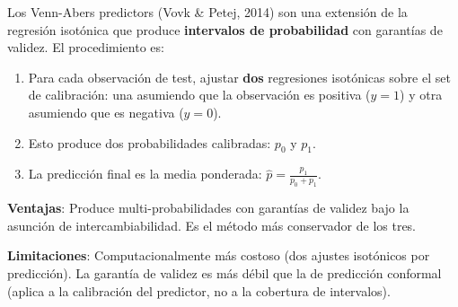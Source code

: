 \documentclass[
  spanish,
  11pt,
  letterpaper,
]{scrbook}
\providecommand{\tightlist}{%
  \setlength{\itemsep}{0pt}\setlength{\parskip}{0pt}}
\theoremstyle{plain}
\theoremstyle{remark}
\begin{document}
Los Venn-Abers predictors (Vovk \& Petej, 2014) son una extensión de la
regresión isotónica que produce \textbf{intervalos de probabilidad} con
garantías de validez. El procedimiento es:

\begin{enumerate}
\def\labelenumi{\arabic{enumi}.}
\tightlist
\item
  Para cada observación de test, ajustar \textbf{dos} regresiones
  isotónicas sobre el set de calibración: una asumiendo que la
  observación es positiva (\(y=1\)) y otra asumiendo que es negativa
  (\(y=0\)).
\item
  Esto produce dos probabilidades calibradas: \(p_0\) y \(p_1\).
\item
  La predicción final es la media ponderada:
  \(\hat{p} = \frac{p_1}{p_0 + p_1}\).
\end{enumerate}

\textbf{Ventajas}: Produce multi-probabilidades con garantías de validez
bajo la asunción de intercambiabilidad. Es el método más conservador de
los tres.

\textbf{Limitaciones}: Computacionalmente más costoso (dos ajustes
isotónicos por predicción). La garantía de validez es más débil que la
de predicción conformal (aplica a la calibración del predictor, no a la
cobertura de intervalos).
\end{document}
